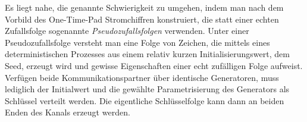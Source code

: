 %	
%
%
%
%
%

Es liegt nahe, die genannte Schwierigkeit zu umgehen, indem man nach dem Vorbild des One-Time-Pad Stromchiffren konstruiert, die statt einer echten Zufallsfolge sogenannte \emph{Pseudozufallsfolgen} verwenden. Unter einer Pseudozufallsfolge versteht man eine Folge von Zeichen, die mittels eines deterministischen Prozesses aus einem relativ kurzen Initialisierungswert, dem Seed, erzeugt wird und gewisse Eigenschaften einer echt zufälligen Folge aufweist. Verfügen beide Kommunikationspartner über identische Generatoren, muss lediglich der Initialwert und die gewählte Parametrisierung des Generators als Schlüssel verteilt werden. Die eigentliche Schlüsselfolge kann dann an beiden Enden des Kanals erzeugt werden.

